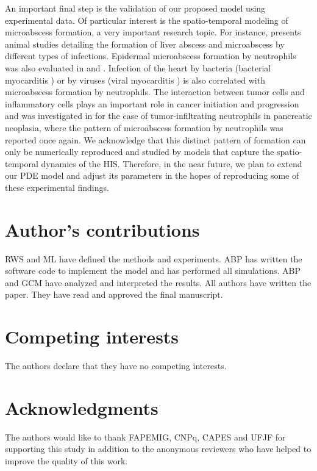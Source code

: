\documentclass[10pt]{bmc_article}
\newenvironment{bmcformat}{\baselineskip20pt\sloppy\setboolean{publ}{false}}{\baselineskip20pt\sloppy}
\begin{document}
\begin{bmcformat}
An important final step is the validation of our proposed model using experimental data. 
Of particular interest is the spatio-temporal modeling of microabscess formation, a very important research topic. 
For instance, \cite{9284178, rigothier2002fat,21151499,10469395}  presents animal studies detailing the formation of liver abscess and 
microabscess by different types of infections. Epidermal microabscess formation by neutrophils was also evaluated 
in \cite{10771480, 16374458, 18006666} and \cite{Movat1986}. Infection of the heart by bacteria (bacterial myocarditis \cite{20937752}) 
or by viruses (viral myocarditis \cite{15668804}) is also correlated with microabscess formation by neutrophils. The interaction between 
tumor cells and inflammatory cells plays an important role in cancer initiation and progression and was investigated in \cite{21822201}
for the case of tumor-infiltrating neutrophils in pancreatic neoplasia, where the pattern of microabscess formation by neutrophils was 
reported once again. We acknowledge that this distinct pattern of formation can only be numerically reproduced and studied by models that 
capture the spatio-temporal dynamics of the HIS. Therefore, in the near future, we plan to extend our PDE model and adjust its parameters 
in the hopes of reproducing some of these experimental findings. 


\bigskip

\section*{Author's contributions}

RWS and ML have defined the methods and experiments. ABP has written the software code to implement the model 
and has performed all simulations. ABP and GCM have analyzed and interpreted the results. All authors have 
written the paper. They have read and approved the final manuscript. 


\section*{Competing interests}    
The authors declare that they have no competing interests.


\section*{Acknowledgments}
The authors would like to thank FAPEMIG, CNPq, CAPES and UFJF for supporting this study in addition to the anonymous reviewers who 
have helped to improve the quality of this work. 




\end{bmcformat}
\end{document}
